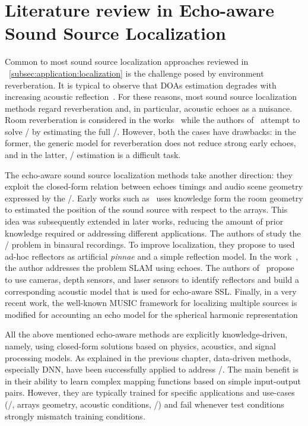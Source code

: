 \section{Literature review in Echo-aware Sound Source Localization}
Common to most sound source localization approaches reviewed in ~\cref{subsec:application:localization} is the challenge posed by environment reverberation.
It is typical to observe that \ac{DOAs} estimation degrades with increasing acoustic reflection~.
For these reasons, most sound source localization methods regard reverberation and, in particular, acoustic echoes as a nuisance.
Room reverberation is considered in the works~ while the authors of~ attempt to solve \SSL/ by estimating the full \RIRs/.
However, both the cases have drawbacks: in the former, the generic model for reverberation does not reduce strong early echoes, and in the latter, \RIRs/ estimation is a difficult task.

\mynewline
The echo-aware sound source localization methods take another direction: they exploit the closed-form relation between echoes timings and audio scene geometry expressed by the \ISMdef/.
Early works such as~ uses knowledge form the room geometry to estimated the position of the sound source with respect to the arrays.
This idea was subsequently extended in later works, reducing the amount of prior knowledge required or addressing different applications.
The authors of   study the \SSL/ problem in binaural recordings.
To improve localization, they propose to used ad-hoc reflectors as artificial \textit{pinnae} and a simple reflection model.
In the work~, the author addresses the problem \ac{SLAM} using echoes.
The authors of~ propose to use cameras, depth sensors, and laser sensors to identify reflectors and build a corresponding acoustic model that is used
for echo-aware \ac{SSL}.
Finally, in a very recent work, the well-known \ac{MUSIC} framework for localizing multiple sources is modified for accounting an echo model for the spherical harmonic representation~

\mynewline
All the above mentioned echo-aware methods are explicitly knowledge-driven, namely, using closed-form solutions based on physics, acoustics, and signal processing models.
As explained in the previous chapter, data-driven methods, especially \ac{DNN}, have been successfully applied to address \SSL/.
The main benefit is in their ability to learn complex mapping functions based on simple input-output pairs.
However, they are typically trained for specific applications and use-cases (\eg/, arrays geometry, acoustic conditions, \etc/) and fail whenever test conditions strongly mismatch training conditions.

